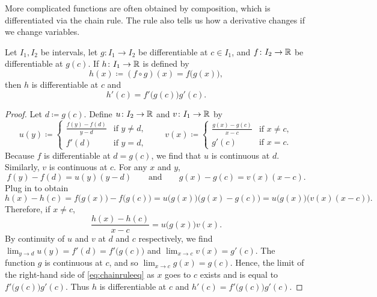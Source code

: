 More complicated functions are often obtained by composition,
which is differentiated via the chain rule.  The rule also tells us
how a derivative changes if we change variables.

\begin{prop}
Let $I_1, I_2$ be intervals, let
$g \colon I_1 \to I_2$ be differentiable at $c \in I_1$,
and
$f \colon I_2 \to {\mathbb{R}}$ be differentiable at $g(c)$.
If $h \colon I_1 \to {\mathbb{R}}$
is defined by
\begin{equation*}
h(x) \coloneqq (f \circ g) (x) = f\bigl(g(x)\bigr) ,
\end{equation*}
then $h$ is differentiable at $c$ and
\begin{equation*}
h'(c) = f'\bigl(g(c)\bigr)g'(c) .
\end{equation*}
\end{prop}

\begin{proof}
Let $d \coloneqq g(c)$.  Define
$u \colon I_2 \to {\mathbb{R}}$ and $v \colon I_1 \to {\mathbb{R}}$ by
\begin{equation*}
u(y) \coloneqq
\begin{cases}
 \frac{f(y) - f(d)}{y-d}  & \text{if } y \neq d, \\
 f'(d)                    & \text{if } y = d,
\end{cases}
\qquad
v(x) \coloneqq
\begin{cases}
 \frac{g(x) - g(c)}{x-c} & \text{if } x \neq c, \\
 g'(c)                   & \text{if } x = c.
\end{cases}
\end{equation*}
Because $f$ is differentiable at $d = g(c)$, we find that
$u$ is continuous at $d$.  Similarly, $v$ is continuous at $c$.
For any $x$ and $y$,
\begin{equation*}
f(y)-f(d) = u(y) (y-d)
\qquad \text{and} \qquad
g(x)-g(c) = v(x) (x-c) .
\end{equation*}
Plug in to obtain
\begin{equation*}
h(x)-h(c)
=
f\bigl(g(x)\bigr)-f\bigl(g(c)\bigr)
=
u\bigl( g(x) \bigr) \bigl(g(x)-g(c)\bigr)
=
u\bigl( g(x) \bigr) \bigl(v(x) (x-c)\bigr) .
\end{equation*}
Therefore, if $x \neq c$,
\begin{equation} \label{eq:chainruleeq}
\frac{h(x)-h(c)}{x-c}
=
u\bigl( g(x) \bigr) v(x) .
\end{equation}
By continuity of $u$ and $v$ at $d$ and $c$ respectively, we find
$\lim_{y \to d} u(y)
= f'(d) = f'\bigl(g(c)\bigr)$ and
$\lim_{x \to c} v(x) = g'(c)$.
The function $g$ is continuous at $c$, and so $\lim_{x \to c} g(x) = g(c)$.
Hence, the limit of
the right-hand side of \eqref{eq:chainruleeq}
as $x$ goes to $c$
exists and is equal to $f'\bigl(g(c)\bigr) g'(c)$.  Thus $h$
is differentiable at $c$ and $h'(c) = f'\bigl(g(c)\bigr)g'(c)$.
\end{proof}

